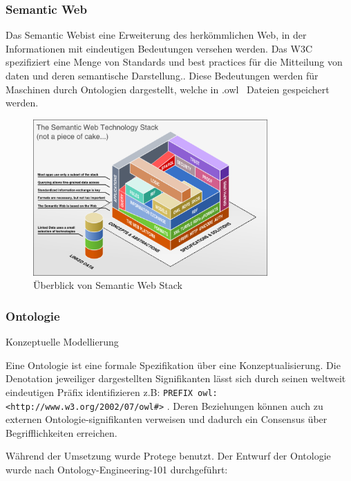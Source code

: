 \documentclass[
12pt,
english,
ngerman,
headsepline,
twoside,
openright,
numbers=noenddot,version=first
]{scrreprt}
\begin{document}
\subsubsection{Semantic Web}
Das \glqq Semantic Web\grqq ist eine Erweiterung des herkömmlichen Web, in der Informationen mit eindeutigen Bedeutungen versehen werden\cite{ontoWhat2}. Das \acrfull{W3C} spezifiziert eine Menge von Standards und best practices für die Mitteilung von daten und deren semantische Darstellung.\cite{sparqlLearn}.
Diese Bedeutungen werden für Maschinen durch Ontologien dargestellt, welche in \glqq .owl \grqq\ Dateien gespeichert werden.\cite{W3C}

\begin{figure}[h]
	\centering
	\includegraphics[width=0.8\textwidth]{pics/semantic_web_technology_stack.eps}
	\caption{Überblick von Semantic Web Stack}
	\label{fig:semantic-web-stack}
\end{figure}

\subsubsection{Ontologie}{Konzeptuelle Modellierung}
\label{subsec:ontology}

Eine Ontologie ist eine formale Spezifikation über eine Konzeptualisierung\cite{ontoWhat}. Die Denotation jeweiliger dargestellten Signifikanten lässt sich durch seinen weltweit eindeutigen Präfix identifizieren z.B: \lstinline|PREFIX owl: <http://www.w3.org/2002/07/owl#>|  \cite{W3C}. Deren Beziehungen können auch zu externen Ontologie-signifikanten verweisen und dadurch ein Consensus über Begrifflichkeiten erreichen. 

Während der Umsetzung wurde Protege\cite{Protégé} benutzt.
Der Entwurf der Ontologie wurde nach Ontology-Engineering-101 durchgeführt:
\end{document}
